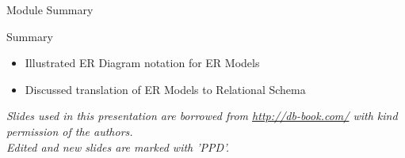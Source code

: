 \documentclass[aspectratio=169, xcolor=dvipsnames]{beamer}
\begin{document}
\begin{frame}{Module Summary}
    \begin{block}{Summary}
        \begin{itemize}[<+->]
            \item Illustrated ER Diagram notation for ER Models
            \item Discussed translation of ER Models to Relational Schema
        \end{itemize}
    \end{block}
    \vspace{2em}
    \begin{center}
    \small \textit{Slides used in this presentation are borrowed from \url{http://db-book.com/} with kind permission of the authors.} \\
    \small \textit{Edited and new slides are marked with 'PPD'.}
    \end{center}
\end{frame}
\end{document}
